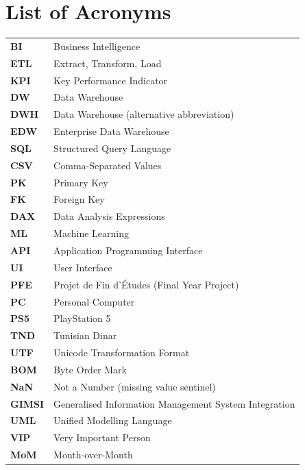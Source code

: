 \documentclass[12pt, a4paper]{report}
\begin{document}
\newpage

\tableofcontents
\newpage
\listoffigures
\newpage
\listoftables
\newpage

\chapter*{List of Acronyms}

\begin{tabular}{ll}
  \textbf{BI}    & Business Intelligence \\
  \textbf{ETL}   & Extract, Transform, Load \\
  \textbf{KPI}   & Key Performance Indicator \\
  \textbf{DW}    & Data Warehouse \\
  \textbf{DWH}   & Data Warehouse (alternative abbreviation) \\
  \textbf{EDW}   & Enterprise Data Warehouse \\
  \textbf{SQL}   & Structured Query Language \\
  \textbf{CSV}   & Comma-Separated Values \\
  \textbf{PK}    & Primary Key \\
  \textbf{FK}    & Foreign Key \\
  \textbf{DAX}   & Data Analysis Expressions \\
  \textbf{ML}    & Machine Learning \\
  \textbf{API}   & Application Programming Interface \\
  \textbf{UI}    & User Interface \\
  \textbf{PFE}   & Projet de Fin d'Études (Final Year Project) \\
  \textbf{PC}    & Personal Computer \\
  \textbf{PS5}   & PlayStation 5 \\
  \textbf{TND}   & Tunisian Dinar \\
  \textbf{UTF}   & Unicode Transformation Format \\
  \textbf{BOM}   & Byte Order Mark \\
  \textbf{NaN}   & Not a Number (missing value sentinel) \\
  \textbf{GIMSI} & Generalised Information Management System Integration \\
  \textbf{UML}   & Unified Modelling Language \\
  \textbf{VIP}   & Very Important Person \\
  \textbf{MoM}   & Month-over-Month \\
\end{tabular}
\end{document}
